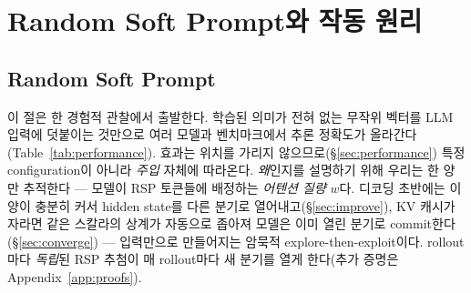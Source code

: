 
\section{Random Soft Prompt와 작동 원리}\label{sec:why_rsp_works}

\subsection{Random Soft Prompt}\label{sec:rsp_definition}

이 절은 한 경험적 관찰에서 출발한다. 학습된 의미가 전혀 없는 무작위 벡터를 LLM 입력에 덧붙이는 것만으로 여러 모델과 벤치마크에서 추론 정확도가 올라간다(Table~\ref{tab:performance}). 효과는 위치를 가리지 않으므로(\S\ref{sec:performance}) 특정 configuration이 아니라 \emph{주입} 자체에 따라온다. \emph{왜}인지를 설명하기 위해 우리는 한 양만 추적한다 --- 모델이 RSP 토큰들에 배정하는 \emph{어텐션 질량} $w$다. 디코딩 초반에는 이 양이 충분히 커서 hidden state를 다른 분기로 열어내고(\S\ref{sec:improve}), KV 캐시가 자라면 같은 스칼라의 상계가 자동으로 좁아져 모델은 이미 열린 분기로 commit한다(\S\ref{sec:converge}) --- 입력만으로 만들어지는 암묵적 explore-then-exploit이다. rollout마다 \emph{독립}된 RSP 추첨이 매 rollout마다 새 분기를 열게 한다(추가 증명은 Appendix~\ref{app:proofs}).

